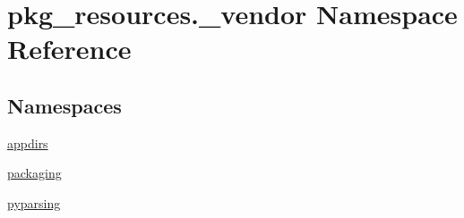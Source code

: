 \hypertarget{namespacepkg__resources_1_1__vendor}{}\section{pkg\+\_\+resources.\+\_\+vendor Namespace Reference}
\label{namespacepkg__resources_1_1__vendor}
\subsection*{Namespaces}
\begin{DoxyCompactItemize}
\item 
 \hyperlink{namespacepkg__resources_1_1__vendor_1_1appdirs}{appdirs}
\item 
 \hyperlink{namespacepkg__resources_1_1__vendor_1_1packaging}{packaging}
\item 
 \hyperlink{namespacepkg__resources_1_1__vendor_1_1pyparsing}{pyparsing}
\end{DoxyCompactItemize}
